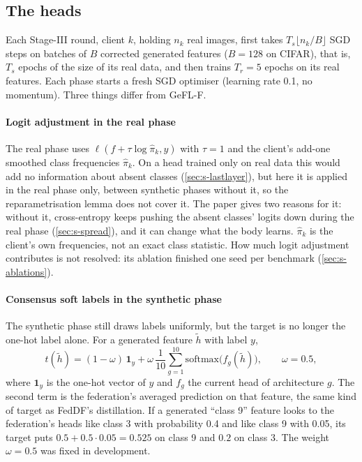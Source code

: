\subsection{The heads}\label{sec:s-heads}

Each Stage-III round, client $k$, holding $n_k$ real images, first takes $T_s\lfloor n_k/B\rfloor$ SGD steps on batches
of $B$ corrected generated features ($B=128$ on CIFAR), that is, $T_s$ epochs of the size of its real data, and then
trains $T_r=5$ epochs on its real features. Each phase starts a fresh SGD optimiser (learning rate 0.1, no momentum).
Three things differ from GeFL-F.

\paragraph{Logit adjustment in the real phase} The real phase uses $\ell(f+\tau\log\hat\pi_k,y)$ with $\tau=1$ and the
client's add-one smoothed class frequencies $\hat\pi_k$. On a head trained only on real data this would add no
information about absent classes (\cref{sec:s-lastlayer}), but here it is applied in the real phase only, between
synthetic phases without it, so the reparametrisation lemma does not cover it. The paper gives two reasons for it:
without it, cross-entropy keeps pushing the absent classes' logits down during the real phase (\cref{sec:s-spread}),
and it can change what the body learns. $\hat\pi_k$ is the client's own frequencies, not an exact class statistic. How
much logit adjustment contributes is not resolved: its ablation finished one seed per benchmark
(\cref{sec:s-ablations}).

\paragraph{Consensus soft labels in the synthetic phase} The synthetic phase still draws labels uniformly, but the
target is no longer the one-hot label alone. For a generated feature $\tilde h$ with label $y$,
\[
t(\tilde h)=(1-\omega)\,\mathbf 1_y+\omega\,\frac1{10}\sum_{g=1}^{10}\mathrm{softmax}\big(f_g(\tilde h)\big),\qquad\omega=0.5,
\]
where $\mathbf 1_y$ is the one-hot vector of $y$ and $f_g$ the current head of architecture $g$. The second term is the
federation's averaged prediction on that feature, the same kind of target as FedDF's distillation. If a generated
``class 9'' feature looks to the federation's heads like class 3 with probability 0.4 and like class 9 with 0.05, its
target puts $0.5+0.5\cdot0.05=0.525$ on class 9 and $0.2$ on class 3. The weight $\omega=0.5$ was fixed in development.

